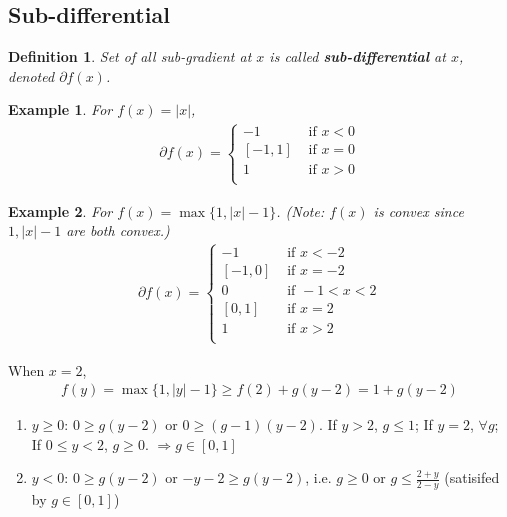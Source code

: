 \documentclass[11pt,a4paper]{article}
\newtheorem{definition}{Definition}
\newtheorem{example}{Example}
\begin{document}
\subsection{Sub-differential}
\begin{definition}
    Set of all sub-gradient at $x$ is called \textbf{sub-differential} at $x$, denoted $\partial f(x)$.
\end{definition}
\begin{example}
For $f(x)=|x|$,
\begin{equation}
    \begin{aligned}
        \partial f(x)=\left\{\begin{matrix}
            -1&\text{ if }x<0\\
            [-1,1]&\text{ if }x=0\\
            1&\text{ if }x>0\\
        \end{matrix}\right.
    \end{aligned}
    \nonumber
\end{equation}
\end{example}

\begin{example}
For $f(x)=\max\{1,|x|-1\}$. (Note: $f(x)$ is convex since $1,|x|-1$ are both convex.)
\begin{equation}
    \begin{aligned}
        \partial f(x)=\left\{\begin{matrix}
            -1&\text{ if }x<-2\\
            [-1,0]&\text{ if }x=-2\\
            0&\text{ if }-1<x<2\\
            [0,1]&\text{ if }x=2\\
            1&\text{ if }x>2\\
        \end{matrix}\right.
    \end{aligned}
    \nonumber
\end{equation}
\end{example}
When $x=2$,
\begin{equation}
    \begin{aligned}
        f(y)=\max\{1,|y|-1\}\geq f(2)+g(y-2)=1+g(y-2)
    \end{aligned}
    \nonumber
\end{equation}
\begin{enumerate}[(1)]
    \item \underline{$y\geq 0$}: $0\geq g(y-2)$ or $0\geq (g-1)(y-2)$. If $y>2$, $g\leq 1$; If $y=2$, $\forall g$; If $0\leq y< 2$, $g\geq 0$. $\Rightarrow g\in[0,1]$
    \item \underline{$y< 0$}: $0\geq g(y-2)$ or $-y-2\geq g(y-2)$, i.e. $g\geq 0$ or $g\leq \frac{2+y}{2-y}$ (satisifed by $g\in[0,1]$)
\end{enumerate}
\end{document}
